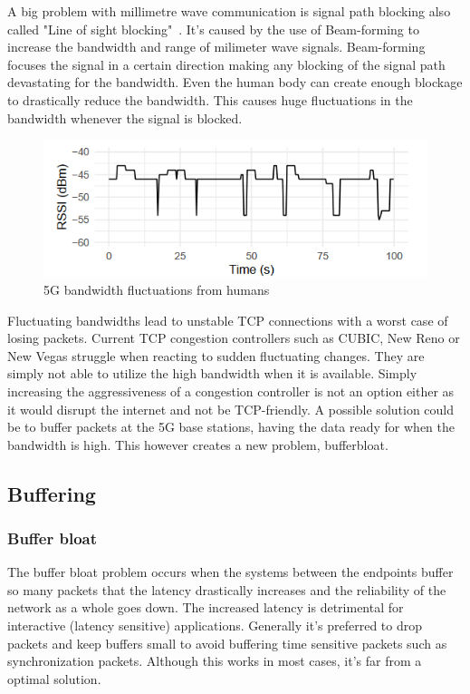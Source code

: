 \documentclass[a4paper,english, 11pt]{report}
\begin{document}
A big problem with millimetre wave communication is signal path blocking also called "Line of sight blocking"~\cite{mmwave_blocking}. It's caused by the use of Beam-forming to increase the bandwidth and range of milimeter wave signals. Beam-forming focuses the signal in a certain direction making any blocking of the signal path devastating for the bandwidth. Even the human body can create enough blockage to drastically reduce the bandwidth. This causes huge fluctuations in the bandwidth whenever the signal is blocked.\\
\begin{figure} %
	\centering
	\includegraphics[scale=1.25]{../diagrams/graphs/tcp_mmwave_blockage.png}
  	\caption{5G bandwidth fluctuations from humans}
  	\label{fig:blockage}
\end{figure}

Fluctuating bandwidths lead to unstable TCP connections with a worst case of losing packets. Current TCP congestion controllers such as CUBIC, New Reno or New Vegas struggle when reacting to sudden fluctuating changes. They are simply not able to utilize the high bandwidth when it is available. Simply increasing the aggressiveness of a congestion controller is not an option either as it would disrupt the internet and not be TCP-friendly. A possible solution could be to buffer packets at the 5G base stations, having the data ready for when the bandwidth is high. This however creates a new problem, bufferbloat.


\subsection{Buffering}
\subsubsection{Buffer bloat}
The buffer bloat problem occurs when the systems between the endpoints buffer so many packets that the latency drastically increases and the reliability of the network as a whole goes down. The increased latency is detrimental for interactive (latency sensitive) applications. Generally it's preferred to drop packets and keep buffers small to avoid buffering time sensitive packets such as synchronization packets. Although this works in most cases, it's far from a optimal solution.\\
\end{document}

